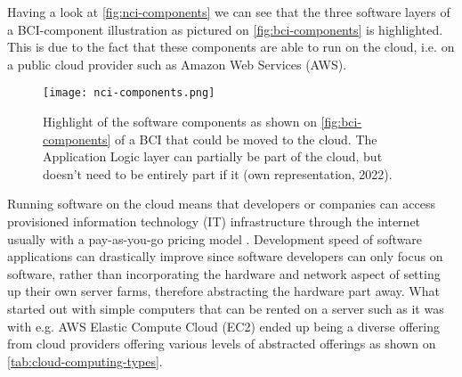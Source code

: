 Having a look at \autoref{fig:nci-components} we can see that the three software layers of a BCI-component illustration as pictured on \autoref{fig:bci-components} is highlighted. This is due to the fact that these components are able to run on the cloud, i.e. on a public cloud provider such as Amazon Web Services (AWS).

\begin{figure}[!ht]
  \centering
  \texttt{[image: nci-components.png]}
  \caption{Highlight of the software components as shown on \autoref{fig:bci-components} of a BCI that could be moved to the cloud. The Application Logic layer can partially be part of the cloud, but doesn't need to be entirely part if it (own representation, 2022).}
  \label{fig:nci-components}
\end{figure}

Running software on the cloud means that developers or companies can access provisioned information technology (IT) infrastructure through the internet usually with a pay-as-you-go pricing model \citep{amazon_web_services_inc_what_nodate}. Development speed of software applications can drastically improve since software developers can only focus on software, rather than incorporating the hardware and network aspect of setting up their own server farms, therefore abstracting the hardware part away. What started out with simple computers that can be rented on a server such as it was with e.g. AWS Elastic Compute Cloud (EC2) \citep{barr_amazon_2006} ended up being a diverse offering from cloud providers offering various levels of abstracted offerings as shown on \autoref{tab:cloud-computing-types}.

